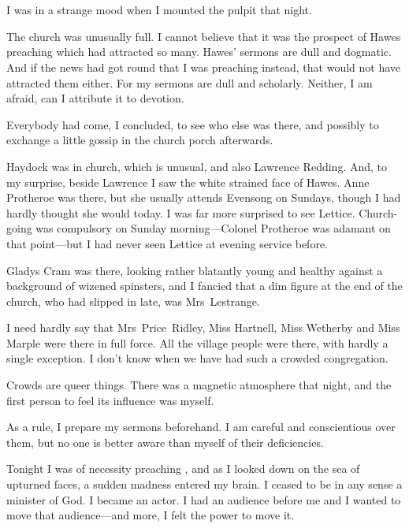 \chapter[Chapter  \thechapter]{}


\lettrine{I}{} was in a strange mood when I mounted the pulpit that night.

\zz
The church was unusually full. I cannot believe that it was the prospect of Hawes preaching which had attracted so many. Hawes' sermons are dull and dogmatic. And if the news had got round that I was preaching instead, that would not have attracted them either. For my sermons are dull and scholarly. Neither, I am afraid, can I attribute it to devotion.

Everybody had come, I concluded, to see who else was there, and possibly to exchange a little gossip in the church porch afterwards.

Haydock was in church, which is unusual, and also Lawrence Redding. And, to my surprise, beside Lawrence I saw the white strained face of Hawes. Anne Protheroe was there, but she usually attends Evensong on Sundays, though I had hardly thought she would today. I was far more surprised to see Lettice. Church-going was compulsory on Sunday morning—Colonel Protheroe was adamant on that point—but I had never seen Lettice at evening service before.

Gladys Cram was there, looking rather blatantly young and healthy against a background of wizened spinsters, and I fancied that a dim figure at the end of the church, who had slipped in late, was Mrs~Lestrange.

I need hardly say that Mrs~Price~Ridley, Miss Hartnell, Miss Wetherby and Miss Marple were there in full force. All the village people were there, with hardly a single exception. I don't know when we have had such a crowded congregation.

Crowds are queer things. There was a magnetic atmosphere that night, and the first person to feel its influence was myself.

As a rule, I prepare my sermons beforehand. I am careful and conscientious over them, but no one is better aware than myself of their deficiencies.

Tonight I was of necessity preaching , and as I looked down on the sea of upturned faces, a sudden madness entered my brain. I ceased to be in any sense a minister of God. I became an actor. I had an audience before me and I wanted to move that audience—and more, I felt the power to move it.

